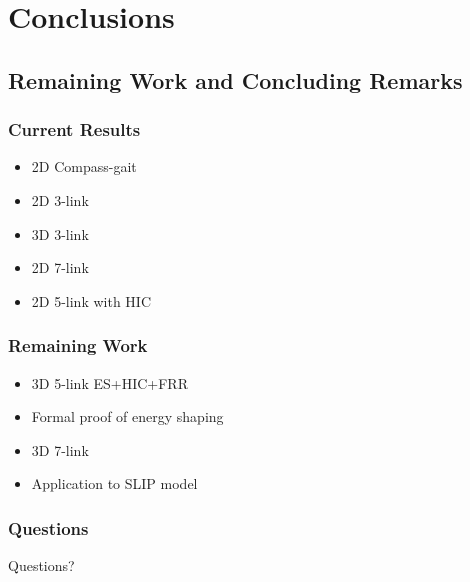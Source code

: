 \section{Conclusions}
\showtoc

\subsection{Remaining Work and Concluding Remarks}
\begin{frame}
  \frametitle{Current Results}
  \begin{itemize}
  \item 2D Compass-gait
  \item 2D 3-link
  \item 3D 3-link
  \item 2D 7-link
  \item 2D 5-link with HIC
  \end{itemize}
\end{frame}

\begin{frame}
  \frametitle{Remaining Work}
  \begin{itemize}
  \item 3D 5-link ES+HIC+FRR
  \item Formal proof of energy shaping
  \item 3D 7-link
  \item Application to SLIP model
  \end{itemize}
\end{frame}

\begin{frame}
  \frametitle{Questions}
  \Large{Questions?}
\end{frame}
